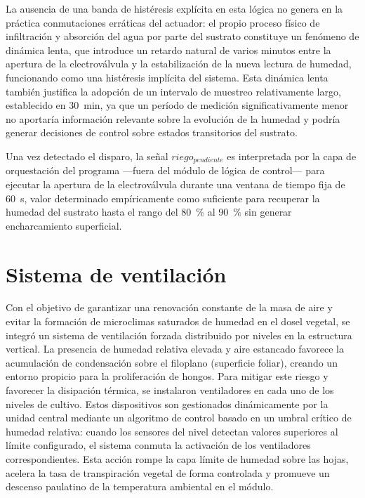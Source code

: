 La ausencia de una banda de histéresis explícita en esta lógica no genera en la práctica conmutaciones erráticas del actuador: el propio proceso físico de infiltración y absorción del agua por parte del sustrato constituye un fenómeno de dinámica lenta, que introduce un retardo natural de varios minutos entre la apertura de la electroválvula y la estabilización de la nueva lectura de humedad, funcionando como una histéresis implícita del sistema. Esta dinámica lenta también justifica la adopción de un intervalo de muestreo relativamente largo, establecido en \SI{30}{\minute}, ya que un período de medición significativamente menor no aportaría información relevante sobre la evolución de la humedad y podría generar decisiones de control sobre estados transitorios del sustrato.

Una vez detectado el disparo, la señal $riego_{pendiente}$ es interpretada por la capa de orquestación del programa ---fuera del módulo de lógica de control--- para ejecutar la apertura de la electroválvula durante una ventana de tiempo fija de \SI{60}{\second}, valor determinado empíricamente como suficiente para recuperar la humedad del sustrato hasta el rango del \SI{80}{\percent} al \SI{90}{\percent} sin generar encharcamiento superficial.


\section{Sistema de ventilación}
\label{sec:sistema_ventilacion}

Con el objetivo de garantizar una renovación constante de la masa de aire y evitar la formación de microclimas saturados de humedad en el dosel vegetal, se integró un sistema de ventilación forzada distribuido por niveles en la estructura vertical. La presencia de humedad relativa elevada y aire estancado favorece la acumulación de condensación sobre el filoplano (superficie foliar), creando un entorno propicio para la proliferación de hongos. Para mitigar este riesgo y favorecer la disipación térmica, se instalaron ventiladores en cada uno de los niveles de cultivo. Estos dispositivos son gestionados dinámicamente por la unidad central mediante un algoritmo de control basado en un umbral crítico de humedad relativa: cuando los sensores del nivel detectan valores superiores al límite configurado, el sistema conmuta la activación de los ventiladores correspondientes. Esta acción rompe la capa límite de humedad sobre las hojas, acelera la tasa de transpiración vegetal de forma controlada y promueve un descenso paulatino de la temperatura ambiental en el módulo.

